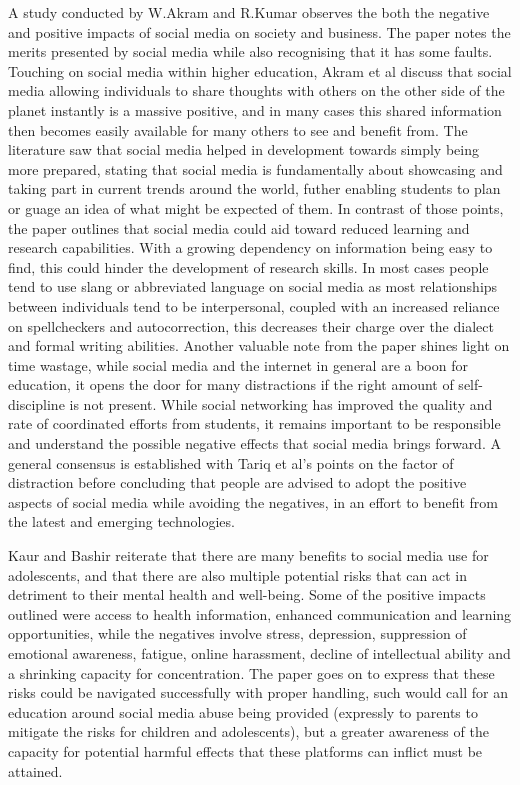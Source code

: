 \documentclass[lettersize,journal]{IEEEtran}
\begin{document}
    A study conducted by W.Akram and R.Kumar \cite{Akram et al 2017} observes the both the negative
    and positive impacts of social media on society and business.  The paper notes the merits presented by social media
    while also recognising that it has some faults. Touching on social media within higher education, Akram et al
    discuss that social media allowing individuals to share thoughts with others on the other side of the planet instantly
    is a massive positive, and in many cases this shared information then becomes easily available for many others to
    see and benefit from. The literature saw that social media helped in development towards simply being more prepared, stating that
    social media is fundamentally about showcasing and taking part in  current trends around the world, futher enabling students
    to plan or guage an idea of what might be expected of them. In contrast of those points, the paper outlines that
    social media could aid toward reduced learning and research capabilities. With a growing dependency on information
    being easy to find, this could hinder the development of research skills. In most cases people tend to use slang or
    abbreviated language on social media as most relationships between individuals tend to be interpersonal, coupled
    with an increased reliance on spellcheckers and autocorrection, this decreases their charge over the dialect and
    formal writing abilities. Another valuable note from the paper shines light on time wastage, while social media
    and the internet in general are a boon for education, it opens the door for many distractions if the right amount
    of self-discipline is not present. While social networking has improved the quality and rate of coordinated
    efforts from students, it remains important to be responsible and understand the possible negative effects
    that social media brings forward. A general consensus is established with Tariq et al's \cite{Tariq et al 2012}
    points on the factor of distraction before concluding that people are advised to adopt the positive aspects of
    social media while avoiding the negatives, in an effort to benefit from the latest and emerging technologies.

    Kaur and Bashir \cite{Bashir et al 2015} reiterate that there are many benefits to social media use
    for adolescents, and that there are also multiple potential risks that can act in detriment to their
    mental health and well-being. Some of the positive impacts outlined were access to health information,
    enhanced communication and learning opportunities, while the negatives involve stress, depression,
    suppression of emotional awareness, fatigue, online harassment, decline of intellectual ability
    and a shrinking capacity for concentration. The paper goes on to express that these risks could be
    navigated successfully with proper handling, such would call for an education around social media abuse
    being provided (expressly to parents to mitigate the risks for children and adolescents), but a greater
    awareness of the capacity for potential harmful effects that these platforms can inflict must be attained.
\end{document}

